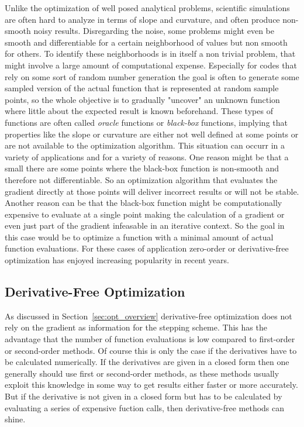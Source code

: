 \documentclass[a4paper,10pt]{article}
\newcommand{\secref}[1]{Section~\ref{#1}}
\begin{document}
    Unlike the optimization of well posed analytical problems, scientific
    simulations are often hard to analyze in terms of slope and 
    curvature, and often produce non-smooth noisy results.
    Disregarding the noise, some problems might even be smooth and
    differentiable for a certain neighborhood of values but non smooth
    for others.
    To identify these neighborhoods is in itself a non trivial problem,
    that might involve a large amount of computational expense.
    Especially for codes that rely on some sort of random number generation
    the goal is often to generate some sampled version of the actual function
    that is represented at random sample points, so the whole
    objective is to gradually "uncover" an unknown function where
    little about the expected result is known beforehand.
    These types of functions are often called \emph{oracle} functions
    or \emph{black-box} functions, implying that properties like
    the slope or curvature are either not well defined at some points
    or are not available to the optimization algorithm.
    This situation can occurr in a variety of applications and
    for a variety of reasons.
    One reason might be that a small there are some points where the
    black-box function is non-smooth and therefore not differentiable.
    So an optimization algorithm that evaluates the gradient directly
    at those points will deliver incorrect results or will
    not be stable.
    Another reason can be that the black-box function might be
    computationally expensive to evaluate at a single point making
    the calculation of a gradient or even just part of the gradient
    infeasable in an iterative context.
    So the goal in this case would be to optimize a function with
    a minimal amount of actual function evaluations.
    For these cases of application zero-order or derivative-free 
    optimization has enjoyed increasing popularity in recent years.

    \subsection{Derivative-Free Optimization} \label{sec:derivative_free}

    As discussed in \secref{sec:opt_overview} derivative-free 
    optimization does not rely on the gradient as information for
    the stepping scheme.
    This has the advantage that the number of function evaluations
    is low compared to first-order or second-order methods.
    Of course this is only the case if the derivatives have to be
    calculated numerically.
    If the derivatives are given in a closed form then one generally
    should use first or second-order methods, as these methods
    usually exploit this knowledge in some way to get results
    either faster or more accurately.
    But if the derivative is not given in a closed form but has to be
    calculated by evaluating a series of expensive fuction calls, then
    derivative-free methods can shine.
\end{document}
